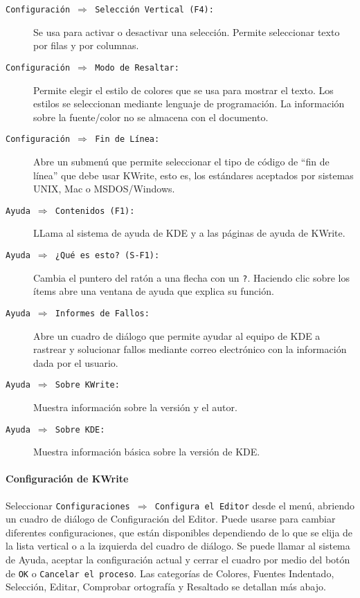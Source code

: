 \begin{description}
\item[{\tt Configuración  $\Rightarrow$ Selección Vertical  (F4):}] Se
usa para activar o desactivar una selección. Permite seleccionar texto
por filas y por columnas.

\item[{\tt  Configuración $\Rightarrow$  Modo  de Resaltar:}]  Permite
elegir  el  estilo de  colores  que  se  usa  para mostrar  el  texto.
Los  estilos  se seleccionan  mediante  lenguaje  de programación.  La
información sobre la fuente/color no se almacena con el documento.

\item[{\tt Configuración $\Rightarrow$ Fin de Línea:}] Abre un submenú
que permite seleccionar el tipo de código de ``fin de línea'' que debe
usar  {\sf KWrite},  esto es,  los estándares  aceptados por  sistemas
UNIX, Mac o MSDOS/Windows.

\item[{\tt Ayuda $\Rightarrow$ Contenidos  (F1):}] LLama al sistema de
ayuda de {\sf KDE} y a las páginas de ayuda de {\sf KWrite}.

\item[{\tt  Ayuda  $\Rightarrow$ ¿Qué  es  esto?  (S-F1):}] Cambia  el
puntero del ratón a una flecha con un {\tt ?}. Haciendo clic sobre los
ítems abre una ventana de ayuda que explica su función.

\item[{\tt Ayuda $\Rightarrow$ Informes de Fallos:}] Abre un cuadro de
diálogo  que permite  ayudar  al  equipo de  {\sf  KDE}  a rastrear  y
solucionar fallos mediante correo  electrónico con la información dada
por el usuario.

\item[{\tt  Ayuda $\Rightarrow$  Sobre  KWrite:}] Muestra  información
sobre la versión y el autor.

\item[{\tt Ayuda $\Rightarrow$ Sobre KDE:}] Muestra información básica
sobre la versión de {\sf KDE}.

\end{description}

\paragraph{Configuración de KWrite}

Seleccionar  {\tt Configuraciones  $\Rightarrow$ Configura  el Editor}
desde  el menú,  abriendo un  cuadro de  diálogo de  Configuración del
Editor.  Puede usarse  para  cambiar  diferentes configuraciones,  que
están disponibles dependiendo de lo que  se elija de la lista vertical
o a la izquierda del cuadro de  diálogo. Se puede llamar al sistema de
Ayuda, aceptar  la configuración actual  y cerrar el cuadro  por medio
del botón de  {\tt OK} o {\tt Cancelar el  proceso}. Las categorías de
Colores, Fuentes Indentado, Selección,  Editar, Comprobar ortografía y
Resaltado se detallan más abajo.

